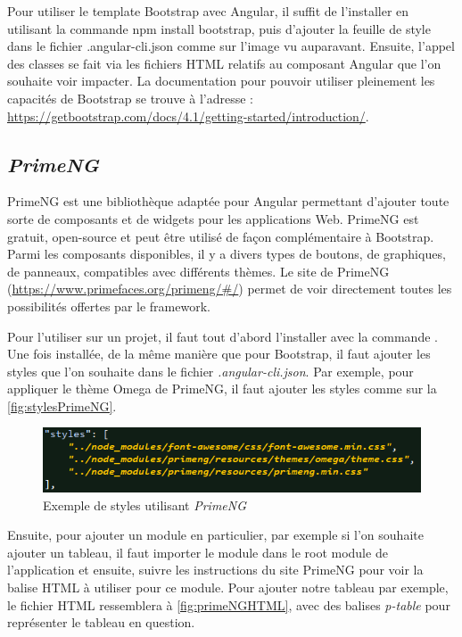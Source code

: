 \documentclass{polytech/polytech}
\begin{document}
Pour utiliser le template Bootstrap avec Angular, il suffit de l’installer en utilisant la commande npm install bootstrap, puis d’ajouter la feuille de style dans le fichier .angular-cli.json comme sur l’image vu auparavant. Ensuite, l’appel des classes se fait via les fichiers HTML relatifs au composant Angular que l’on souhaite voir impacter. La documentation pour pouvoir utiliser pleinement les capacités de Bootstrap se trouve à l’adresse : \url{https://getbootstrap.com/docs/4.1/getting-started/introduction/}.

\subsection{\textit{PrimeNG}}

PrimeNG est une bibliothèque adaptée pour Angular permettant d’ajouter toute sorte de composants et de widgets pour les applications Web. PrimeNG est gratuit, open-source et peut être utilisé de façon complémentaire à Bootstrap. Parmi les composants disponibles, il y a divers types de boutons, de graphiques, de panneaux, compatibles avec différents thèmes. Le site de PrimeNG (\url{https://www.primefaces.org/primeng/#/}) permet de voir directement toutes les possibilités offertes par le framework. 

Pour l’utiliser sur un projet, il faut tout d’abord l’installer avec la commande . Une fois installée, de la même manière que pour Bootstrap, il faut ajouter les styles que l’on souhaite dans le fichier \textit{.angular-cli.json}. Par exemple, pour appliquer le thème Omega de PrimeNG, il faut ajouter les styles comme sur la \autoref{fig:stylesPrimeNG}. 

\begin{figure}
	\includegraphics[scale=0.8]{images/styles_primeng}
	\caption{Exemple de styles utilisant \textit{PrimeNG}}
	\label{fig:stylesPrimeNG}
\end{figure}

Ensuite, pour ajouter un module en particulier, par exemple si l’on souhaite ajouter un tableau, il faut importer le module dans le root module de l’application et ensuite, suivre les instructions du site PrimeNG pour voir la balise HTML à utiliser pour ce module. Pour ajouter notre tableau par exemple, le fichier HTML ressemblera à \autoref{fig:primeNGHTML}, avec des balises \textit{p-table} pour représenter le tableau en question.
\end{document}
